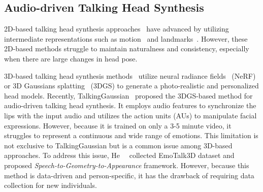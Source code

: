 
\subsection{Audio-driven Talking Head Synthesis}
2D-based talking head synthesis approaches~\cite{prajwal2020lip,zhang2023dinet,chen2018lip,chung2017out,zhou2019talking,song2018talking,gan2023efficient,wang2023progressive} have advanced by utilizing intermediate representations such as motion~\cite{wang2021audio2head,chen2019hierarchical,wang2022one} and landmarks~\cite{zakharov2019few,zhou2020makelttalk,zhong2023identity,zhong2023identity}. However, these 2D-based methods struggle to maintain naturalness and consistency, especially when there are large changes in head pose.

3D-based talking head synthesis methods~\cite{guo2021ad,li2023efficient,ye2023geneface,shen2022learning,tang2022real,li2024s,cho2024gaussiantalker} utilize neural radiance fields~\cite{mildenhall2021nerf} (NeRF) or 3D Gaussians splatting~\cite{kerbl20233d} (3DGS) to generate a photo-realistic and personalized head models. Recently, TalkingGaussian~\cite{li2024talkinggaussian} proposed the 3DGS-based method for audio-driven talking head synthesis. It employs audio features to synchronize the lips with the input audio and utilizes the action units (AUs) to manipulate facial expressions. However, because it is trained on only a 3-5 minute video, it struggles to represent a continuous and wide range of emotions. This limitation is not exclusive to TalkingGaussian but is a common issue among 3D-based approaches. To address this issue, He~\etal~\cite{he2024emotalk3d} collected EmoTalk3D dataset and proposed \textit{Speech-to-Geometry-to-Appearance} framework. However, because this method is data-driven and person-specific, it has the drawback of requiring data collection for new individuals.
